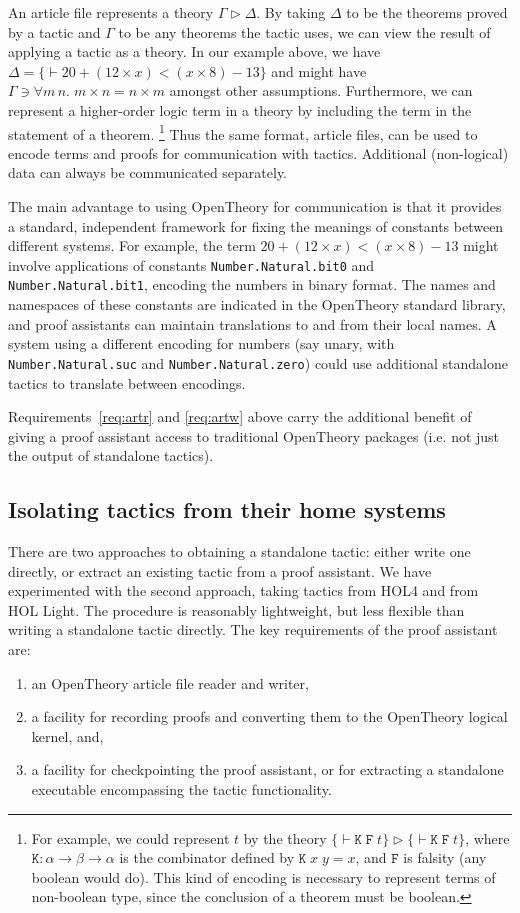 \documentclass{llncs}
\newcommand{\OpenTheory}{OpenTheory\xspace}
\newcommand{\ie}{i.e.\xspace}
\begin{document}
An article file represents a theory $\Gamma\rhd\Delta$.
By taking $\Delta$ to be the theorems proved by a tactic and $\Gamma$ to be any theorems the tactic uses, we can view the result of applying a tactic as a theory.
In our example above, we have $\Delta=\{\vdash20+(12\times x)<(x\times 8)-13\}$ and might have $\Gamma\ni\forall{m\,n}.\;m\times n = n\times m$ amongst other assumptions.
Furthermore, we can represent a higher-order logic term in a theory by including the term in the statement of a theorem. \footnote{For example, we could represent $t$ by the theory $\{\vdash\mathtt{K\;F\;}t\}\rhd\{\vdash\mathtt{K\;F\;}t\}$, where $\mathtt{K}:\alpha\to\beta\to\alpha$ is the combinator defined by $\mathtt{K}\;x\;y=x$, and $\mathtt{F}$ is falsity (any boolean would do).
This kind of encoding is necessary to represent terms of non-boolean type, since the conclusion of a theorem must be boolean.}
Thus the same format, article files, can be used to encode terms and proofs for communication with tactics.
Additional (non-logical) data can always be communicated separately.

The main advantage to using \OpenTheory for communication is that it provides a standard, independent framework for fixing the meanings of constants between different systems.
For example, the term $20+(12\times x)<(x\times 8)-13$ might involve applications of constants \texttt{Number.Natural.bit0} and \texttt{Number.Natural.bit1}, encoding the numbers in binary format.
The names and namespaces of these constants are indicated in the \OpenTheory standard library, and proof assistants can maintain translations to and from their local names.
A system using a different encoding for numbers (say unary, with \texttt{Number.Natural.suc} and \texttt{Number.Natural.zero}) could use additional standalone tactics to translate between encodings.

Requirements~\ref{req:artr} and \ref{req:artw} above carry the additional benefit of giving a proof assistant access to traditional \OpenTheory packages (\ie not just the output of standalone tactics).

\subsection{Isolating tactics from their home systems}
There are two approaches to obtaining a standalone tactic: either write one directly, or extract an existing tactic from a proof assistant. 
We have experimented with the second approach, taking tactics from HOL4 and from HOL Light.
The procedure is reasonably lightweight, but less flexible than writing a standalone tactic directly.
The key requirements of the proof assistant are:
\begin{enumerate}
\item
\label{req:io} an \OpenTheory article file reader and writer,
\item
\label{req:log} a facility for recording proofs and converting them to the \OpenTheory logical kernel, and,
\item
\label{req:ckpt} a facility for checkpointing the proof assistant, or for extracting a standalone executable encompassing the tactic functionality.
\end{enumerate}
\end{document}

